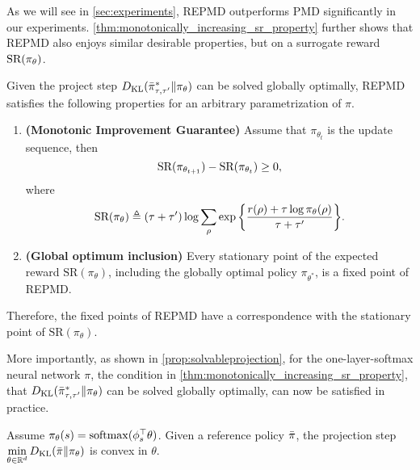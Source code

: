 As we will see in \cref{sec:experiments}, REPMD outperforms PMD significantly in our experiments. 
\cref{thm:monotonically_increasing_sr_property} further shows that REPMD also enjoys similar desirable properties, but on a surrogate reward $\text{SR}(\pi_\theta) $.
\begin{thm}
\label{thm:monotonically_increasing_sr_property}
Given the project step $D_{\mathrm{KL}}( \bar{\pi}_{\tau,\tau^{\prime}}^* \| \pi_\theta )$ can be solved globally optimally, REPMD satisfies the following properties for an arbitrary parametrization of $\pi$.
\begin{enumerate}
	\item {\bf (Monotonic Improvement Guarantee)} 
	Assume that $\pi_{\theta_{t}}$ is the update sequence, then 
	\begin{equation*}
	\text{SR}(\pi_{\theta_{t+1}}) - \text{SR}(\pi_{\theta_t})\ge 0,
	\end{equation*}
	where
	\begin{equation}
	\label{eq:SR}
	\text{SR}(\pi_\theta) \triangleq (\tau + \tau^{\prime})\log{ \sum_{\rho}{ \exp\left\{ \frac{r(\rho) + \tau \log{\pi_\theta(\rho)} }{\tau + \tau^{\prime}} \right\} }}.
	\end{equation}
	\item {\bf (Global optimum inclusion)} Every stationary point of the expected reward $\text{SR}(\pi_\theta)$, including the globally optimal policy $\pi_{\theta^*}$,  is a fixed point of REPMD.
\end{enumerate}
Therefore, 
the fixed points of REPMD have a correspondence with the stationary point of $\text{SR}(\pi_\theta)$. 
\end{thm}

More importantly, as shown in \cref{prop:solvableprojection}, 
for the one-layer-softmax neural network $\pi$, the condition in \cref{thm:monotonically_increasing_sr_property}, that $D_{\mathrm{KL}}( \bar{\pi}_{\tau,\tau^{\prime}}^* \| \pi_\theta )$ can be solved globally optimally, can now be satisfied in practice.
\begin{prop}
	\label{prop:solvableprojection}
	Assume $\pi_\theta(s) = \mathrm{softmax}(\phi_s^{\top}\theta)$. Given a reference policy $\bar{\pi}$, the projection step $\min\limits_{\theta \in \mathbb{R}^d}{D_{\mathrm{KL}}(\bar{\pi} \| \pi_\theta)}$ is convex in $\theta$.
\end{prop}


